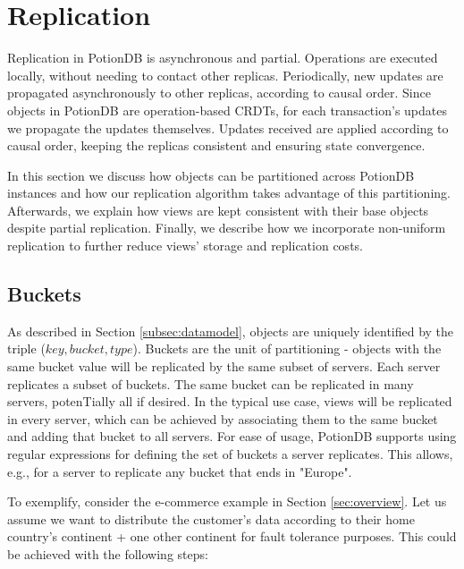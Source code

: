 \documentclass{vldb}
\begin{document}
\section{Replication}
\label{sec:replication}
Replication in PotionDB is asynchronous and partial.
Operations are executed locally, without needing to contact other replicas.
Periodically, new updates are propagated asynchronously to other replicas, according to causal order.
Since objects in PotionDB are operation-based CRDTs, for each transaction's updates we propagate the updates themselves.
Updates received are applied according to causal order, keeping the replicas consistent and ensuring state convergence.

In this section we discuss how objects can be partitioned across PotionDB instances and how our replication algorithm takes advantage of this partitioning.
Afterwards, we explain how views are kept consistent with their base objects despite partial replication.
Finally, we describe how we incorporate non-uniform replication to further reduce views' storage and replication costs.

\subsection{Buckets}
\label{subsec:buckets}
As described in Section \ref{subsec:datamodel}, objects are uniquely identified by the triple ($key, bucket, type$).
Buckets are the unit of partitioning - objects with the same bucket value will be replicated by the same subset of servers.
Each server replicates a subset of buckets.
The same bucket can be replicated in many servers, potenTially all if desired.
In the typical use case, views will be replicated in every server, which can be achieved by associating them to the same bucket and adding that bucket to all servers.
For ease of usage, PotionDB supports using regular expressions for defining the set of buckets a server replicates.
This allows, e.g., for a server to replicate any bucket that ends in "Europe".

To exemplify, consider the e-commerce example in Section \ref{sec:overview}.
Let us assume we want to distribute the customer's data according to their home country's continent + one other continent for fault tolerance purposes.
This could be achieved with the following steps:
\end{document}
